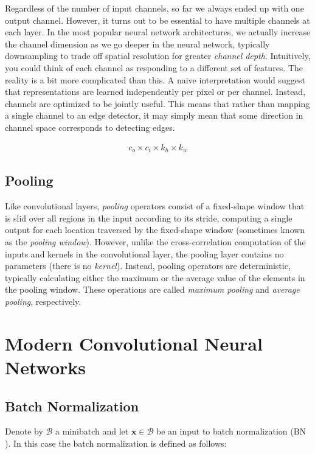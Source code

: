 \documentclass[a4paper,12pt]{article}
\theoremstyle{definition}
\begin{document}
Regardless of the number of input channels, so far we always ended up with one output channel. However, it turns out to be essential to have multiple channels
at each layer. In the most popular neural network architectures, we actually increase the channel dimension as we go deeper in the neural network, typically downsampling to trade off spatial
resolution for greater \emph{channel depth}. Intuitively, you could think of each channel as responding to a different set of features. The reality is a bit more complicated than this.
A naive interpretation would suggest that representations are learned independently per pixel or per channel. Instead, channels are optimized to be jointly useful. This means that rather
than mapping a single channel to an edge detector, it may simply mean that some direction in channel space corresponds to detecting edges.


\begin{align*}
    c_o\times c_i\times k_h\times k_w
\end{align*}


\subsection{Pooling}
Like convolutional layers, \emph{pooling} operators consist of a fixed-shape window that is slid over all regions in the input according to its stride, computing a single
output for each location traversed by the fixed-shape window (sometimes known as the \emph{pooling window}). However, unlike the cross-correlation computation of the inputs and kernels
in the convolutional layer, the pooling layer contains no parameters (there is no \emph{kernel}). Instead, pooling operators are deterministic, typically calculating either the maximum
or the average value of the elements in the pooling window. These operations are called \emph{maximum pooling} and \emph{average pooling}, respectively.


\section{Modern Convolutional Neural Networks}
\subsection*{Batch Normalization}
Denote by $\mathcal{B}$ a minibatch and let $\mathbf{x} \in \mathcal{B}$ be an input to batch normalization ($\mathrm{BN}$). In this case the batch normalization is defined as follows:
\end{document}
